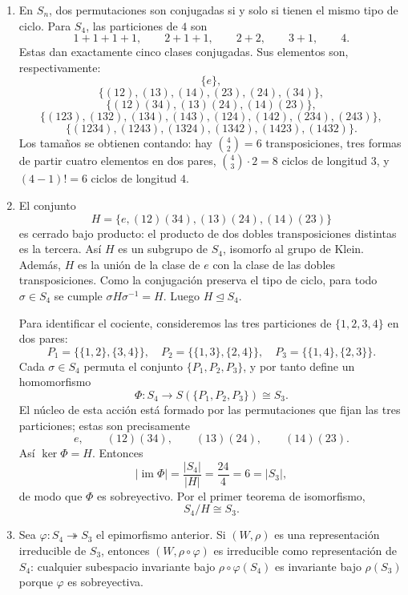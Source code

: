 \documentclass[10pt,a4paper]{article}
\begin{document}
\begin{enumerate}[label=(\alph*),leftmargin=2.4em]
\item En $S_n$, dos permutaciones son conjugadas si y solo si tienen el mismo tipo de
ciclo. Para $S_4$, las particiones de $4$ son
\[
  1+1+1+1,\qquad 2+1+1,\qquad 2+2,\qquad 3+1,\qquad 4.
\]
Estas dan exactamente cinco clases conjugadas. Sus elementos son, respectivamente:
\[
  \{e\},
\]
\[
  \{(12), (13), (14), (23), (24), (34)\},
\]
\[
  \{(12)(34), (13)(24), (14)(23)\},
\]
\[
  \{(123), (132), (134), (143), (124), (142), (234), (243)\},
\]
\[
  \{(1234), (1243), (1324), (1342), (1423), (1432)\}.
\]
Los tamaños se obtienen contando: hay $\binom42=6$ transposiciones, tres formas de partir
cuatro elementos en dos pares, $\binom43\cdot 2=8$ ciclos de longitud $3$, y $(4-1)!=6$
ciclos de longitud $4$.

\item El conjunto
\[
  H=\{e,(12)(34),(13)(24),(14)(23)\}
\]
es cerrado bajo producto: el producto de dos dobles transposiciones distintas es la tercera.
Así $H$ es un subgrupo de $S_4$, isomorfo al grupo de Klein. Además, $H$ es la unión de la
clase de $e$ con la clase de las dobles transposiciones. Como la conjugación preserva el
tipo de ciclo, para todo $\sigma\in S_4$ se cumple $\sigma H\sigma^{-1}=H$. Luego
$H\trianglelefteq S_4$.

Para identificar el cociente, consideremos las tres particiones de $\{1,2,3,4\}$ en dos
pares:
\[
  P_1=\bigl\{\{1,2\},\{3,4\}\bigr\},\quad
  P_2=\bigl\{\{1,3\},\{2,4\}\bigr\},\quad
  P_3=\bigl\{\{1,4\},\{2,3\}\bigr\}.
\]
Cada $\sigma\in S_4$ permuta el conjunto $\{P_1,P_2,P_3\}$, y por tanto define un
homomorfismo
\[
  \Phi:S_4\longrightarrow S(\{P_1,P_2,P_3\})\cong S_3.
\]
El núcleo de esta acción está formado por las permutaciones que fijan las tres particiones;
estas son precisamente
\[
  e,
  \qquad (12)(34),
  \qquad (13)(24),
  \qquad (14)(23).
\]
Así $\ker\Phi=H$. Entonces
\[
  |\operatorname{im}\Phi|=\frac{|S_4|}{|H|}=\frac{24}{4}=6=|S_3|,
\]
de modo que $\Phi$ es sobreyectivo. Por el primer teorema de isomorfismo,
\[
  S_4/H\cong S_3.
\]

\item Sea $\varphi:S_4\twoheadrightarrow S_3$ el epimorfismo anterior. Si
$(W,\rho)$ es una representación irreducible de $S_3$, entonces
$(W,\rho\circ\varphi)$ es irreducible como representación de $S_4$: cualquier subespacio
invariante bajo $\rho\circ\varphi(S_4)$ es invariante bajo $\rho(S_3)$ porque $\varphi$ es
sobreyectiva.


\end{enumerate}
\end{document}
